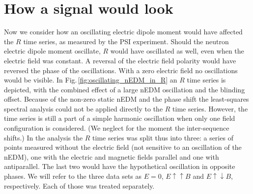\section{How a signal would look}
Now we consider how an oscillating electric dipole moment would have affected the $R$ time series, as measured by the PSI experiment.
Should the neutron electric dipole moment oscillate, $R$ would have oscillated as well, even when the electric field was constant.
A reversal of the electric field polarity would have reversed the phase of the oscillations.
With a zero electric field no oscillations would be visible.
In Fig.\,\ref{fig:oscillating_nEDM_in_R} an $R$ time series is depicted, with the combined effect of a large nEDM oscillation and the blinding offset.
Because of the non-zero static nEDM and the phase shift the least-squares spectral analysis could not be applied directly to the $R$ time series.
However, the time series is still a part of a simple harmonic oscillation when only one field configuration is considered.
(We neglect for the moment the inter-sequence shifts.) In the analysis the $R$ time series was split thus into three: a series of points measured without the electric field (not sensitive to an oscillation of the nEDM), one with the electric and magnetic fields parallel and one with antiparallel.
The last two would have the hypothetical oscillation in opposite phases.
We will refer to the three data sets as $E=0$, $E \uparrow \uparrow B$ and $E \uparrow \downarrow B$, respectively.
Each of those was treated separately.

